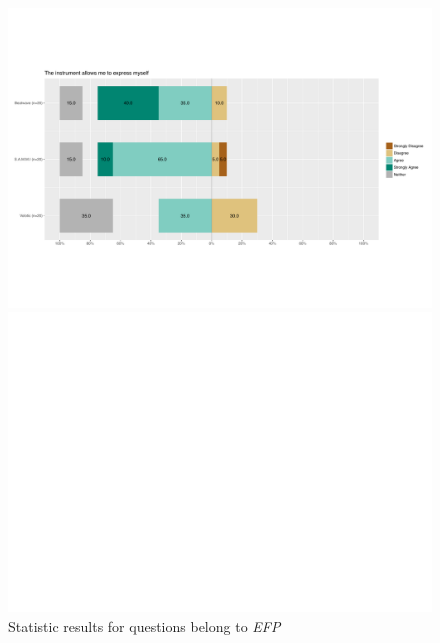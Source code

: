 \begin{figure}
\begin{minipage}[b]{0.5\textwidth}
\includegraphics[width=\linewidth]{figs/Q5.pdf}
\end{minipage}
\begin{minipage}[b]{0.5\textwidth}
\includegraphics[width=\linewidth]{figs/Q0.pdf}
\end{minipage}

\caption{Statistic results for questions belong to \textit{EFP}}
\label{fig: EFP}
\end{figure}
\bigskip

